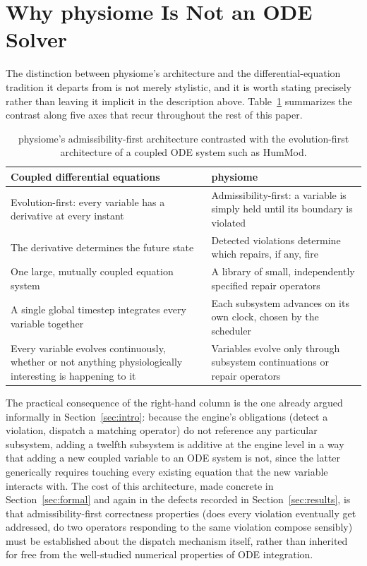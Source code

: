 \documentclass[11pt]{article}
\begin{document}
\section{Why physiome Is Not an ODE Solver}
\label{sec:not-ode}

The distinction between physiome's architecture and the differential-equation tradition it departs from is not merely stylistic, and it is worth stating precisely rather than leaving it implicit in the description above. Table~\ref{tab:ode-comparison} summarizes the contrast along five axes that recur throughout the rest of this paper.

\begin{table}[h]
\centering
\begin{tabular}{@{}p{5.6cm}p{5.6cm}@{}}
\toprule
Coupled differential equations & physiome \\
\midrule
Evolution-first: every variable has a derivative at every instant & Admissibility-first: a variable is simply held until its boundary is violated \\
The derivative determines the future state & Detected violations determine which repairs, if any, fire \\
One large, mutually coupled equation system & A library of small, independently specified repair operators \\
A single global timestep integrates every variable together & Each subsystem advances on its own clock, chosen by the scheduler \\
Every variable evolves continuously, whether or not anything physiologically interesting is happening to it & Variables evolve only through subsystem continuations or repair operators \\
\bottomrule
\end{tabular}
\caption{physiome's admissibility-first architecture contrasted with the evolution-first architecture of a coupled ODE system such as HumMod.}
\label{tab:ode-comparison}
\end{table}

The practical consequence of the right-hand column is the one already argued informally in Section~\ref{sec:intro}: because the engine's obligations (detect a violation, dispatch a matching operator) do not reference any particular subsystem, adding a twelfth subsystem is additive at the engine level in a way that adding a new coupled variable to an ODE system is not, since the latter generically requires touching every existing equation that the new variable interacts with. The cost of this architecture, made concrete in Section~\ref{sec:formal} and again in the defects recorded in Section~\ref{sec:results}, is that admissibility-first correctness properties (does every violation eventually get addressed, do two operators responding to the same violation compose sensibly) must be established about the dispatch mechanism itself, rather than inherited for free from the well-studied numerical properties of ODE integration.
\end{document}
